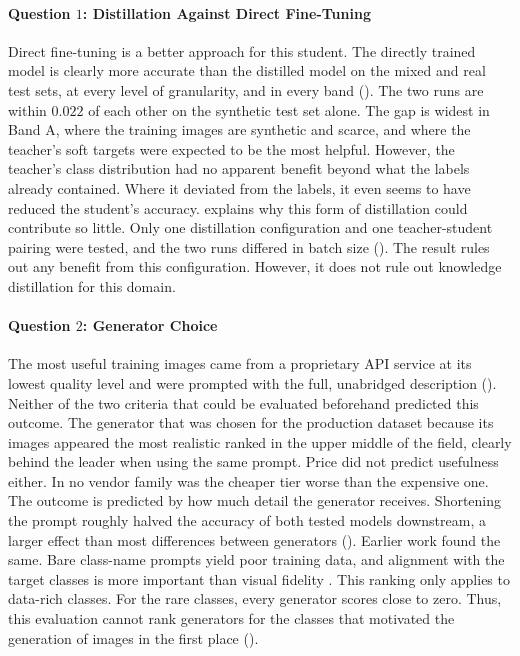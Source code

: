 \paragraph{Question $1$: Distillation Against Direct Fine-Tuning}
Direct fine-tuning is a better approach for this student. The directly trained model is clearly more accurate than the distilled model on the mixed and real test sets, at every level of granularity, and in every band (). The two runs are within $0.022$ of each other on the synthetic test set alone. The gap is widest in Band A, where the training images are synthetic and scarce, and where the teacher's soft targets were expected to be the most helpful. However, the teacher's class distribution had no apparent benefit beyond what the labels already contained. Where it deviated from the labels, it even seems to have reduced the student's accuracy.  explains why this form of distillation could contribute so little. Only one distillation configuration and one teacher-student pairing were tested, and the two runs differed in batch size (). The result rules out any benefit from this configuration. However, it does not rule out knowledge distillation for this domain.

\paragraph{Question $2$: Generator Choice}
The most useful training images came from a proprietary API service at its lowest quality level and were prompted with the full, unabridged description (). Neither of the two criteria that could be evaluated beforehand predicted this outcome. The generator that was chosen for the production dataset because its images appeared the most realistic ranked in the upper middle of the field, clearly behind the leader when using the same prompt. Price did not predict usefulness either. In no vendor family was the cheaper tier worse than the expensive one. The outcome is predicted by how much detail the generator receives. Shortening the prompt roughly halved the accuracy of both tested models downstream, a larger effect than most differences between generators (). Earlier work found the same. Bare class-name prompts yield poor training data, and alignment with the target classes is more important than visual fidelity \cite{aziziSyntheticDataDiffusion2023}. This ranking only applies to data-rich classes. For the rare classes, every generator scores close to zero. Thus, this evaluation cannot rank generators for the classes that motivated the generation of images in the first place ().

